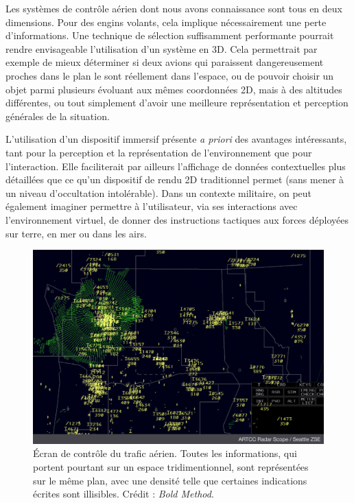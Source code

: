 	Les systèmes de contrôle aérien dont nous avons connaissance sont tous en deux dimensions. Pour des engins volants, cela implique nécessairement une perte d'informations. Une technique de sélection suffisamment performante pourrait rendre envisageable l'utilisation d'un système en 3D. Cela permettrait par exemple de mieux déterminer si deux avions qui paraissent dangereusement proches dans le plan le sont réellement dans l'espace, ou de pouvoir choisir un objet parmi plusieurs évoluant aux mêmes coordonnées 2D, mais à des altitudes différentes, ou tout simplement d'avoir une meilleure représentation et perception générales de la situation.
	
	L'utilisation d'un dispositif immersif présente \emph{a priori} des avantages intéressants, tant pour la perception et la représentation de l'environnement que pour l'interaction. Elle faciliterait par ailleurs l'affichage de données contextuelles plus détaillées que ce qu'un dispositif de rendu 2D traditionnel permet (sans mener à un niveau d'occultation intolérable). Dans un contexte militaire, on peut également imaginer permettre à l'utilisateur, via ses interactions avec l'environnement virtuel, de donner des instructions tactiques aux forces déployées sur terre, en mer ou dans les airs.

	\begin{figure}[H]
		\centering
		\includegraphics[width=\textwidth]{figures/ch1/Radar-Scope-ZSE}
		\caption[Écran de contrôle du trafic aérien, en 2D.]{Écran de contrôle du trafic aérien. Toutes les informations, qui portent pourtant sur un espace tridimentionnel, sont représentées sur le même plan, avec une densité telle que certaines indications écrites sont illisibles. Crédit : \emph{Bold Method}\footnotemark.}
		\label{fig:airtraffic}
	\end{figure}
	

